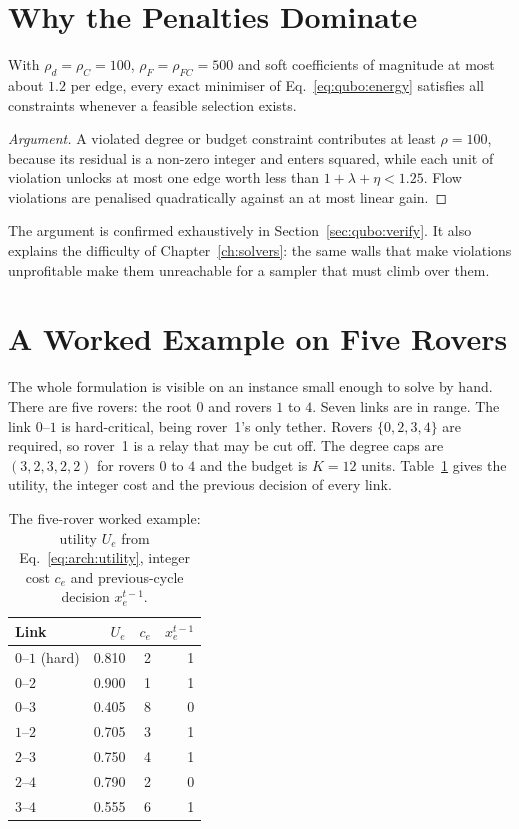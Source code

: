 \section{Why the Penalties Dominate}

\begin{proposition}
With $\rho_d=\rho_C=100$, $\rho_F=\rho_{FC}=500$ and soft coefficients of
magnitude at most about $1.2$ per edge, every exact minimiser of
Eq.~\eqref{eq:qubo:energy} satisfies all constraints whenever a feasible
selection exists.
\end{proposition}

\begin{proof}[Argument]
A violated degree or budget constraint contributes at least $\rho=100$,
because its residual is a non-zero integer and enters squared, while each unit
of violation unlocks at most one edge worth less than $1+\lambda+\eta<1.25$.
Flow violations are penalised quadratically against an at most linear gain.
\end{proof}

The argument is confirmed exhaustively in Section~\ref{sec:qubo:verify}.
It also explains the difficulty of Chapter~\ref{ch:solvers}: the same walls
that make violations unprofitable make them unreachable for a sampler that
must climb over them.

\section{A Worked Example on Five Rovers}
\label{sec:qubo:worked}

The whole formulation is visible on an instance small enough to solve by
hand. There are five rovers: the root $0$ and rovers $1$ to $4$. Seven links
are in range. The link $0$--$1$ is hard-critical, being rover~1's only
tether. Rovers $\{0,2,3,4\}$ are required, so rover~1 is a relay that may be
cut off. The degree caps are $(3,2,3,2,2)$ for rovers $0$ to $4$ and the
budget is $K=12$ units. Table~\ref{tab:qubo:worked} gives the utility, the
integer cost and the previous decision of every link.

\begin{table}[htbp]
\centering
\caption{The five-rover worked example: utility $U_e$ from
Eq.~\eqref{eq:arch:utility}, integer cost $c_e$ and previous-cycle decision
$x_e^{t-1}$.}
\label{tab:qubo:worked}
\small
\begin{tabular}{@{}l r r r@{}}
\toprule
Link & $U_e$ & $c_e$ & $x_e^{t-1}$ \\
\midrule
$0$--$1$ (hard) & 0.810 & 2 & 1 \\
$0$--$2$ & 0.900 & 1 & 1 \\
$0$--$3$ & 0.405 & 8 & 0 \\
$1$--$2$ & 0.705 & 3 & 1 \\
$2$--$3$ & 0.750 & 4 & 1 \\
$2$--$4$ & 0.790 & 2 & 0 \\
$3$--$4$ & 0.555 & 6 & 1 \\
\bottomrule
\end{tabular}
\end{table}

